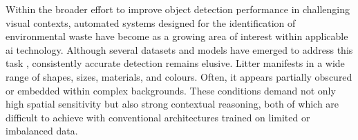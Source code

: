 
Within the broader effort to improve object detection performance in challenging visual contexts, automated systems designed for the identification of environmental waste have become as a growing area of interest within applicable \gls{ai} technology. Although several datasets and models have emerged to address this task \cite{taco2020, zerowaste, plastopol}, consistently accurate detection remains elusive. Litter manifests in a wide range of shapes, sizes, materials, and colours. Often, it appears partially obscured or embedded within complex backgrounds. These conditions demand not only high spatial sensitivity but also strong contextual reasoning, both of which are difficult to achieve with conventional architectures trained on limited or imbalanced data.


